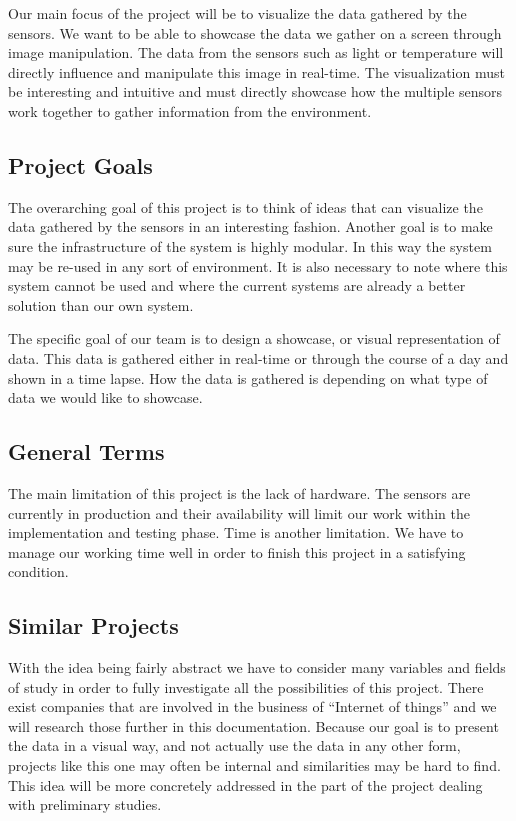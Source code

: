﻿\documentclass[../document.tex]{subfiles}
\begin{document}
Our main focus of the project will be to visualize the data gathered by the sensors. We want to be able to showcase the data we gather on a screen through image manipulation. The data from the sensors such as light or temperature will directly influence and manipulate this image in real-time. The visualization must be interesting and intuitive and must directly showcase how the multiple sensors work together to gather information from the environment.

\subsection*{Project Goals}
The overarching goal of this project is to think of ideas that can visualize the data gathered by the sensors in an interesting fashion. Another goal is to make sure the infrastructure of the system is highly modular. In this way the system may be re-used in any sort of environment. It is also necessary to note where this system cannot be used and where the current systems are already a better solution than our own system.

The specific goal of our team is to design a showcase, or visual representation of data. This data is gathered either in real-time or through the course of a day and shown in a time lapse. How the data is gathered is depending on what type of data we would like to showcase. 


\subsection*{General Terms}
The main limitation of this project is the lack of hardware. The sensors are currently in production and their availability will limit our work within the implementation and testing phase. Time is another limitation. We have to manage our working time well in order to finish this project in a satisfying condition.

\subsection*{Similar Projects}
With the idea being fairly abstract we have to consider many variables and fields of study in order to fully investigate all the possibilities of this project. There exist companies that are involved in the business of “Internet of things” and we will research those further in this documentation. Because our goal is to present the data in a visual way, and not actually use the data in any other form, projects like this one may often be internal and similarities may be hard to find. This idea will be more concretely addressed in the part of the project dealing with preliminary studies.
\end{document}
